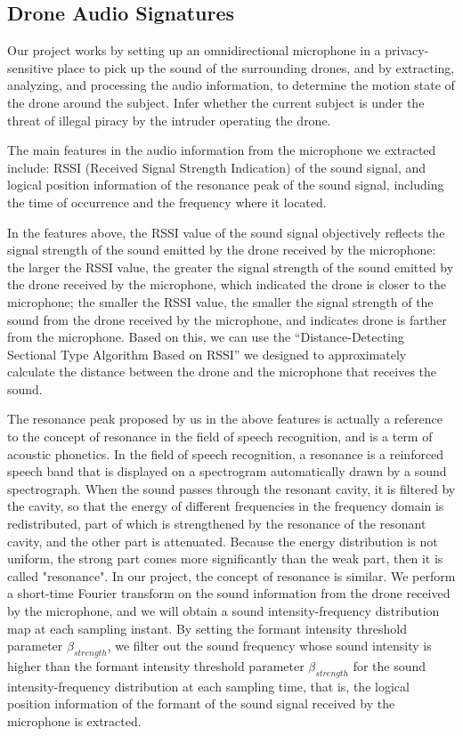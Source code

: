 \documentclass{sig-alternate-10pt}
\begin{document}
\subsection{Drone Audio Signatures}
Our project works by setting up an omnidirectional microphone in a privacy-sensitive place to pick up the sound of the surrounding drones, and by extracting, analyzing, and processing the audio information, to determine the motion state of the drone around the subject. Infer whether the current subject is under the threat of illegal piracy by the intruder operating the drone.

The main features in the audio information from the microphone we extracted include: RSSI (Received Signal Strength Indication) of the sound signal, and logical position information of the resonance peak of the sound signal, including the time of occurrence and the frequency where it located.

In the features above, the RSSI value of the sound signal objectively reflects the signal strength of the sound emitted by the drone received by the microphone: the larger the RSSI value, the greater the signal strength of the sound emitted by the drone received by the microphone, which indicated the drone is closer to the microphone; the smaller the RSSI value, the smaller the signal strength of the sound from the drone received by the microphone, and indicates drone is farther from the microphone. Based on this, we can use the “Distance-Detecting Sectional Type Algorithm Based on RSSI” we designed to approximately calculate the distance between the drone and the microphone that receives the sound. 

The resonance peak proposed by us in the above features is actually a reference to the concept of resonance in the field of speech recognition, and is a term of acoustic phonetics. In the field of speech recognition, a resonance is a reinforced speech band that is displayed on a spectrogram automatically drawn by a sound spectrograph. When the sound passes through the resonant cavity, it is filtered by the cavity, so that the energy of different frequencies in the frequency domain is redistributed, part of which is strengthened by the resonance of the resonant cavity, and the other part is attenuated. Because the energy distribution is not uniform, the strong part comes more significantly than the weak part, then it is called "resonance". In our project, the concept of resonance is similar. We perform a short-time Fourier transform on the sound information from the drone received by the microphone, and we will obtain a sound intensity-frequency distribution map at each sampling instant. By setting the formant intensity threshold parameter $\beta_{strength}$, we filter out the sound frequency whose sound intensity is higher than the formant intensity threshold parameter $\beta_{strength}$ for the sound intensity-frequency distribution at each sampling time, that is, the logical position information of the formant of the sound signal received by the microphone is extracted. 
\end{document}
